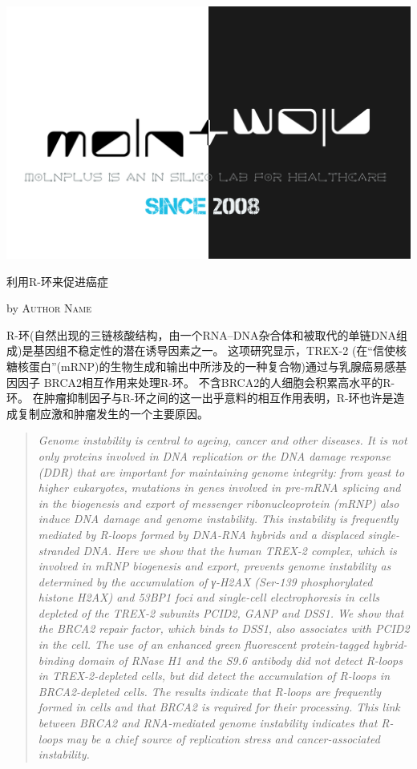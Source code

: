 \documentclass[10pt,a4paper]{article}
\newcommand{\NewsItem}[1]{ %
\usefont{T1}{fvs}{n}{n} %
\vspace{24pt}\large #1\vspace{3pt} %
\par \normalsize \normalfont}
\newcommand{\NewsAuthor}[1]{ %
\hfill by \textsc{#1} \vspace{20pt} %
\par \normalfont}
\begin{document}
\begin{multicols}{2}
\begin{center}
\includegraphics[width=0.8\linewidth]{molnplus.png} %
\end{center}


\NewsItem{利用R-环来促进癌症}
\NewsAuthor{Author Name}

R-环(自然出现的三链核酸结构，由一个RNA–DNA杂合体和被取代的单链DNA组成)是基因组不稳定性的潜在诱导因素之一。
这项研究显示，TREX-2 (在“信使核糖核蛋白”(mRNP)的生物生成和输出中所涉及的一种复合物)通过与乳腺癌易感基因因子 BRCA2相互作用来处理R-环。
不含BRCA2的人细胞会积累高水平的R-环。
在肿瘤抑制因子与R-环之间的这一出乎意料的相互作用表明，R-环也许是造成复制应激和肿瘤发生的一个主要原因。\cite{BhaBarGar1406}

\begin{quotation} %

\noindent\normalsize\textit{Genome instability is central to ageing, cancer and other diseases. It is not only proteins involved in DNA replication or the DNA damage response (DDR) that are important for maintaining genome integrity: from yeast to higher eukaryotes, mutations in genes involved in pre-mRNA splicing and in the biogenesis and export of messenger ribonucleoprotein (mRNP) also induce DNA damage and genome instability. This instability is frequently mediated by R-loops formed by DNA-RNA hybrids and a displaced single-stranded DNA. Here we show that the human TREX-2 complex, which is involved in mRNP biogenesis and export, prevents genome instability as determined by the accumulation of γ-H2AX (Ser-139 phosphorylated histone H2AX) and 53BP1 foci and single-cell electrophoresis in cells depleted of the TREX-2 subunits PCID2, GANP and DSS1. We show that the BRCA2 repair factor, which binds to DSS1, also associates with PCID2 in the cell. The use of an enhanced green fluorescent protein-tagged hybrid-binding domain of RNase H1 and the S9.6 antibody did not detect R-loops in TREX-2-depleted cells, but did detect the accumulation of R-loops in BRCA2-depleted cells. The results indicate that R-loops are frequently formed in cells and that BRCA2 is required for their processing. This link between BRCA2 and RNA-mediated genome instability indicates that R-loops may be a chief source of replication stress and cancer-associated instability.}


\end{quotation}
\end{multicols}
\end{document}
